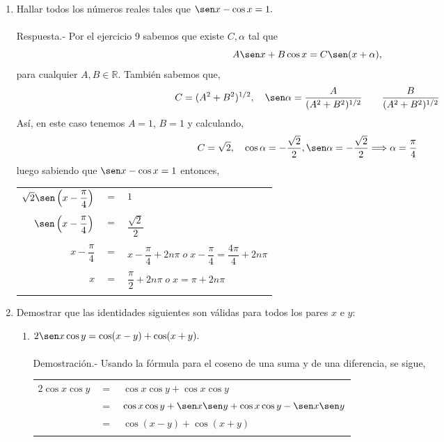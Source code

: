\begin{enumerate}[\bfseries 1.]
\item Hallar todos los números reales tales que $\sen x - \cos x = 1.$\\\\
    Respuesta.-\; Por el ejercicio 9 sabemos que existe $C,\alpha$ tal que $$A\sen x +B\cos x = C\sen(x+\alpha),$$
    para cualquier $A,B \in \mathbb{R}$. También sabemos que,
    $$C= (A^2 + B^2)^{1/2}, \quad \sen \alpha = \dfrac{A}{(A^2+B^2)^{1/2}} \qquad \dfrac{B}{(A^2+B^2)^{1/2}}$$
    Así, en este caso tenemos $A=1$, $B=1$ y calculando,
    $$C=\sqrt{2}, \quad \cos \alpha = - \dfrac{\sqrt{2}}{2}, \sen \alpha = -\dfrac{\sqrt{2}}{2} \Longrightarrow \alpha = \dfrac{\pi}{4}$$
    luego sabiendo que $\sen x - \cos x = 1$ entonces,
    \begin{center}
	\begin{tabular}{rcl}
	    $\sqrt{2} \sen \left(x-\dfrac{\pi}{4}\right)$&$=$&$1$\\\\
	    $\sen\left(x-\dfrac{\pi}{4}\right)$&$=$&$\dfrac{\sqrt{2}}{2}$\\\\
	    $x-\dfrac{\pi}{4}$&$=$&$x-\dfrac{\pi}{4}+2n\pi \; o \; x-\dfrac{\pi}{4} = \dfrac{4\pi}{4}+2n\pi$\\\\
	    $x$&$=$&$\dfrac{\pi}{2}+2n\pi \; o \; x = \pi + 2n\pi$\\\\
	\end{tabular}
    \end{center}

\item Demostrar que las identidades siguientes son válidas para todos los pares $x$ e $y$:

    \begin{enumerate}[\bfseries (a)]

	\item $2\sen x \cos y = \cos(x-y) + \cos(x+y).$\\\\
	    Demostración.-\; Usando la fórmula para el coseno de una suma y de una diferencia, se sigue,\\
	    \begin{center}
		\begin{tabular}{rcl}
		    $2\cos x \cos y$&$=$&$\cos x \cos y + \cos x \cos y$\\
		    &$=$&$\cos x \cos y + \sen x \sen y + \cos x \cos y -\sen x \sen y$\\
		    &$=$&$\cos(x-y)+\cos(x+y)$\\\\
		\end{tabular}
	    \end{center}



\end{enumerate}
\end{enumerate}
